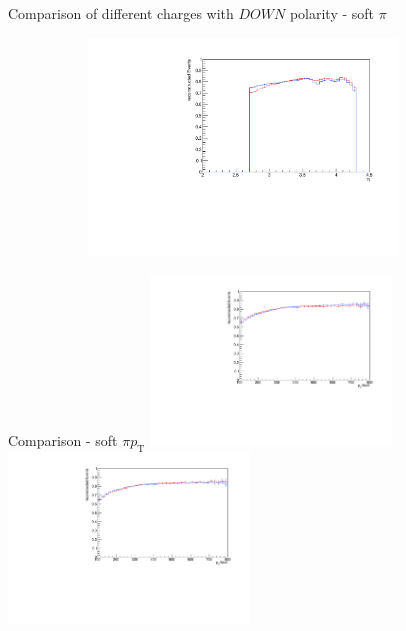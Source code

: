 \documentclass[11pt]{beamer}
\begin{document}
\begin{frame}{Comparison of different charges with $DOWN$ polarity - soft $\pi$}
\begin{figure}
\begin{subfigure}{0.45\textwidth}
\end{subfigure}
\begin{subfigure}{0.45\textwidth}
\includegraphics[width=0.9\textwidth]{third/down_pdf/combined/h_eta_reco_SPi.pdf}
\end{subfigure}
\end{figure}
\end{frame}
\begin{frame}{Comparison - soft $\pi p_\text{T}$}
\centering
\includegraphics[width=0.48\textwidth]{third/up_pdf/combined/h_pt_reco_SPi.pdf}
\includegraphics[width=0.48\textwidth]{third/down_pdf/combined/h_pt_reco_SPi.pdf}
\end{frame}
\end{document}
